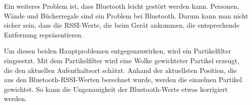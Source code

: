 Ein weiteres Problem ist, dass Bluetooth leicht gestört werden kann. Personen, Wände und Bücherregale sind ein Problem bei Bluetooth. Darum kann man nicht sicher sein, dass die RSSI-Werte, die beim Gerät ankommen, die entsprechende Entfernung repräsentieren. 

Um diesen beiden Hauptproblemen entgegenzuwirken, wird ein Partikelfilter eingesetzt. Mit dem Partikelfilter wird eine Wolke gewichteter Partikel erzeugt, die den aktuellen Aufenthaltsort schätzt. Anhand der aktuellsten Position, die aus den Bluetooth-RSSI-Werten berechnet wurde, werden die einzelnen Partikel gewichtet. So kann die Ungenauigkeit der Bluetooth-Werte etwas korrigiert werden. \cite{wiki:001}